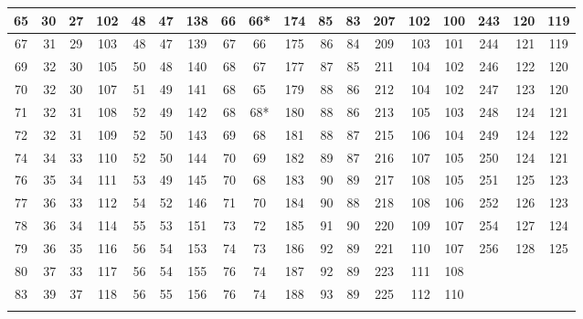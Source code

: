 \documentclass{article}
\theoremstyle{definition}
\theoremstyle{remark}
\begin{document}
\begin{table}[p]
{\begin{minipage}{0.92\textheight}
{\begin{tabular}{c|r|c||c|r|c||c|r|c||c|r|c||c|r|c||c|r|c}
\hline
65 & 30 & 27 & 102 & 48 & 47 & 138 & 66 & 66* & 174 & 85 & 83 & 207 & 102 & 100 & 243 & 120 & 119\\
\hline
67 & 31 & 29 & 103 & 48 & 47 & 139 & 67 & 66 & 175 & 86 & 84 & 209 & 103 & 101 & 244 & 121 & 119\\
\hline
69 & 32 & 30 & 105 & 50 & 48 & 140 & 68 & 67 & 177 & 87 & 85 & 211 & 104 & 102 & 246 & 122 & 120\\
\hline
70 & 32 & 30 & 107 & 51 & 49 & 141 & 68 & 65 & 179 & 88 & 86 & 212 & 104 & 102 & 247 & 123 & 120\\
\hline
71 & 32 & 31 & 108 & 52 & 49 & 142 & 68 & 68* & 180 & 88 & 86 & 213 & 105 & 103 & 248 & 124 & 121\\
\hline
72 & 32 & 31 & 109 & 52 & 50 & 143 & 69 & 68 & 181 & 88 & 87 & 215 & 106 & 104 & 249 & 124 & 122\\
\hline
74 & 34 & 33 & 110 & 52 & 50 & 144 & 70 & 69 & 182 & 89 & 87 & 216 & 107 & 105 & 250 & 124 & 121\\
\hline
76 & 35 & 34 & 111 & 53 & 49 & 145 & 70 & 68 & 183 & 90 & 89 & 217 & 108 & 105 & 251 & 125 & 123\\
\hline
77 & 36 & 33 & 112 & 54 & 52 & 146 & 71 & 70 & 184 & 90 & 88 & 218 & 108 & 106 & 252 & 126 & 123\\
\hline
78 & 36 & 34 & 114 & 55 & 53 & 151 & 73 & 72 & 185 & 91 & 90 & 220 & 109 & 107 & 254 & 127 & 124\\
\hline
79 & 36 & 35 & 116 & 56 & 54 & 153 & 74 & 73 & 186 & 92 & 89 & 221 & 110 & 107 & 256 & 128 & 125\\
\hline
80 & 37 & 33 & 117 & 56 & 54 & 155 & 76 & 74 & 187 & 92 & 89 & 223 & 111 & 108 &  &  & \\
\hline
83 & 39 & 37 & 118 & 56 & 55 & 156 & 76 & 74 & 188 & 93 & 89 & 225 & 112 & 110 &  &  & \\
\Xhline{2\arrayrulewidth}
\end{tabular}%
}
\end{minipage}%
}
\end{table}
\end{document}
